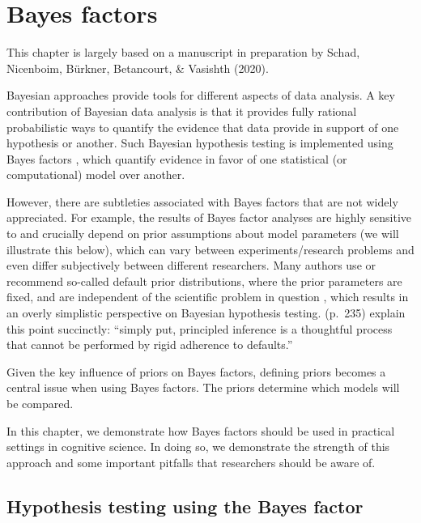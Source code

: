 \documentclass[12pt,]{krantz}
\theoremstyle{definition}
\theoremstyle{definition}
\theoremstyle{definition}
\theoremstyle{remark}
\begin{document}
\chapter{Bayes factors}\label{ch:bf}

This chapter is largely based on a manuscript in preparation by Schad,
Nicenboim, Bürkner, Betancourt, \& Vasishth (2020).

Bayesian approaches provide tools for different aspects of data
analysis. A key contribution of Bayesian data analysis is that it
provides fully rational probabilistic ways to quantify the evidence that
data provide in support of one hypothesis or another. Such Bayesian
hypothesis testing is implemented using Bayes factors
\citep{rouder2018bayesian, schonbrodt2018bayes, wagenmakers2010BayesianHypothesisTesting, kass1995bayes, gronau2017tutorial, jeffreys1939theory},
which quantify evidence in favor of one statistical (or computational)
model over another.

However, there are subtleties associated with Bayes factors that are not
widely appreciated. For example, the results of Bayes factor analyses
are highly sensitive to and crucially depend on prior assumptions about
model parameters (we will illustrate this below), which can vary between
experiments/research problems and even differ subjectively between
different researchers. Many authors use or recommend so-called default
prior distributions, where the prior parameters are fixed, and are
independent of the scientific problem in question
\citep{hammerly2019grammaticality, navarro2015learning}, which results
in an overly simplistic perspective on Bayesian hypothesis testing.
\citet{rouder2009bayesian} (p.~235) explain this point succinctly:
``simply put, principled inference is a thoughtful process that cannot
be performed by rigid adherence to defaults.''

Given the key influence of priors on Bayes factors, defining priors
becomes a central issue when using Bayes factors. The priors determine
which models will be compared.

In this chapter, we demonstrate how Bayes factors should be used in
practical settings in cognitive science. In doing so, we demonstrate the
strength of this approach and some important pitfalls that researchers
should be aware of.

\section{Hypothesis testing using the Bayes
factor}\label{hypothesis-testing-using-the-bayes-factor}
\end{document}
